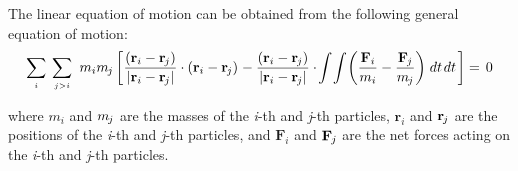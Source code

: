 \documentclass[10pt]{article}
\newcommand{\mM}{m}
\newcommand{\ri}{_i}
\newcommand{\vR}{\mathbf{r}}
\newcommand{\vF}{\mathbf{F}}
\newcommand{\rj}{_{\hspace{-0.081em}j}}
\begin{document}
\par The linear equation of motion can be obtained from the following general equation of motion:
{\fontsize{8}{8}\selectfont\begin{eqnarray*}
\sum_{\scriptscriptstyle i} \hspace{+0.24em} \sum_{\scriptscriptstyle j>i} \hspace{+0.36em} \mM\ri\mM\rj \left[ \hspace{+0.03em} \frac{(\vR\ri - \vR\rj)}{|\vR\ri - \vR\rj|} \cdot (\vR\ri - \vR\rj) \hspace{+0.06em} - \frac{(\vR\ri - \vR\rj)}{|\vR\ri - \vR\rj|} \cdot \hspace{-0.12em} \int \hspace{-0.12em} \int \hspace{-0.12em} \left(\frac{\vF\ri}{\mM\ri} - \frac{\vF\rj}{\mM\rj}\right) \hspace{+0.12em} dt \hspace{+0.12em} dt \hspace{+0.12em} \right] = \hspace{+0.15em} 0
\end{eqnarray*}}
\vspace{-0.60em}
\par \noindent where $\mM\ri$ and $\mM\rj$ are the masses of the \textit{i}-th and \textit{j}-th particles, $\vR\ri$ and $\vR\rj$ are the positions of the \textit{i}-th and \textit{j}-th particles, and $\vF\ri$ and $\vF\rj$ are the net forces acting on the \textit{i}-th and \textit{j}-th particles.
\end{document}
